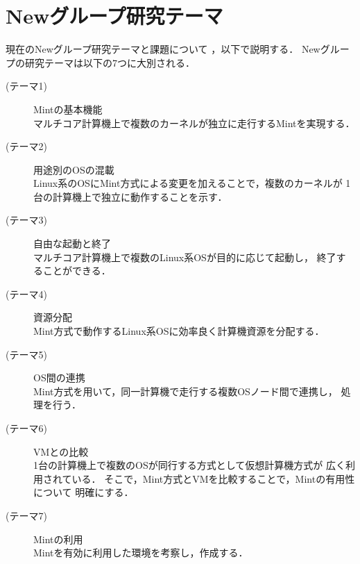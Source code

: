\documentclass[12pt]{jsarticle}
\begin{document}
\section{Newグループ研究テーマ}
現在のNewグループ研究テーマと課題について
，以下で説明する．
Newグループの研究テーマは以下の7つに大別される．
\begin{description}
    \item[(テーマ1)] Mintの基本機能\\
        マルチコア計算機上で複数のカーネルが独立に走行するMintを実現する．
    \item[(テーマ2)] 用途別のOSの混載\\
        Linux系のOSにMint方式による変更を加えることで，複数のカーネルが
        1台の計算機上で独立に動作することを示す．
    \item[(テーマ3)] 自由な起動と終了\\
        マルチコア計算機上で複数のLinux系OSが目的に応じて起動し，
        終了することができる．
    \item[(テーマ4)] 資源分配\\
        Mint方式で動作するLinux系OSに効率良く計算機資源を分配する．
    \item[(テーマ5)] OS間の連携\\
        Mint方式を用いて，同一計算機で走行する複数OSノード間で連携し，
        処理を行う．
    \item[(テーマ6)] VMとの比較\\
        1台の計算機上で複数のOSが同行する方式として仮想計算機方式が
        広く利用されている．
        そこで，Mint方式とVMを比較することで，Mintの有用性について
        明確にする．
    \item[(テーマ7)] Mintの利用\\
        Mintを有効に利用した環境を考察し，作成する．
\end{description}
\end{document}
